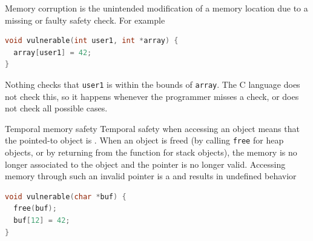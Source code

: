 \begin{parag}{Memory corruption}
     is the unintended modification of a memory location due to a missing or faulty safety check. For example
    \begin{lstlisting}[language=C]
void vulnerable(int user1, int *array) {
  array[user1] = 42;
}
    \end{lstlisting}
    Nothing checks that \texttt{user1} is within the bounds of \texttt{array}. The C language does not check this, so it happens whenever the programmer misses a check, or does not check all possible cases.
\end{parag}

\begin{parag}{Temporal memory safety}
    Temporal safety when accessing an object means that the pointed-to object is . When an object is freed (by calling \texttt{free} for heap objects, or by returning from the function for stack objects), the memory is no longer associated to the object and the pointer is no longer valid. Accessing memory through such an invalid pointer is a  and results in undefined behavior
    \begin{lstlisting}[language=C]
void vulnerable(char *buf) {
  free(buf);
  buf[12] = 42;
}
    \end{lstlisting}
\end{parag}

